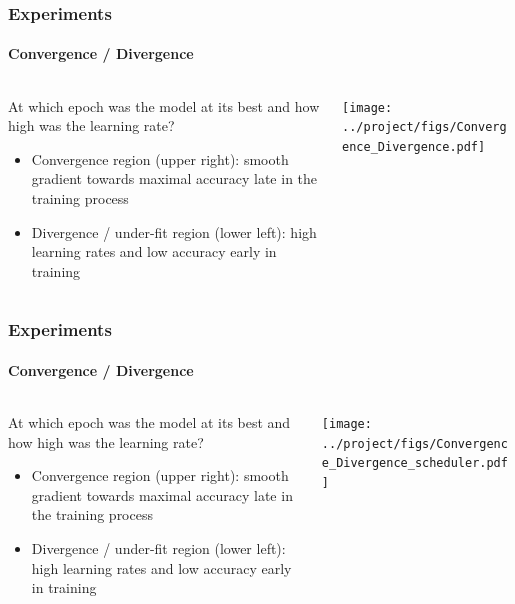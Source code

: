 \documentclass[10pt,aspectratio=169]{beamer}
\begin{document}
    \begin{frame}
        \frametitle{Experiments}
        \framesubtitle{Convergence / Divergence}
        \begin{columns}
            \begin{column}{0.5\textwidth}
                At which epoch was the model at its best and how high was the learning rate?

                \begin{itemize}
                    \item Convergence region (upper right): smooth gradient towards maximal accuracy late in the training process 
                    \item Divergence / under-fit region (lower left): high learning rates and low accuracy early in training
                \end{itemize}
            \end{column}
            \begin{column}{0.5\textwidth}
                \texttt{[image: ../project/figs/Convergence\_Divergence.pdf]}
            \end{column}
        \end{columns}
    \end{frame}

    \begin{frame}
        \frametitle{Experiments}
        \framesubtitle{Convergence / Divergence}
        \begin{columns}
            \begin{column}{0.5\textwidth}
                At which epoch was the model at its best and how high was the learning rate?
                \begin{itemize}
                    \item Convergence region (upper right): smooth gradient towards maximal accuracy late in the training process 
                    \item Divergence / under-fit region (lower left): high learning rates and low accuracy early in training
                \end{itemize}
            \end{column}
            \begin{column}{0.5\textwidth}
                \texttt{[image: ../project/figs/Convergence\_Divergence\_scheduler.pdf]}
            \end{column}
        \end{columns}
    \end{frame}
\end{document}
